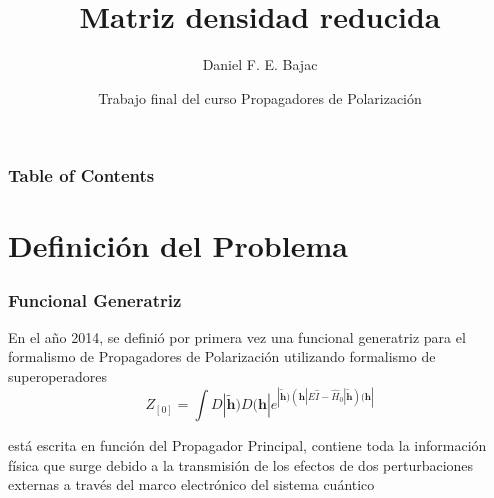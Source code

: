 \documentclass{beamer}
\title[Curso: Propagadoress de Polarización] %
{Matriz densidad reducida}
\author[Daniel F. E. Bajac] %
{Daniel F. E. Bajac}
\institute[] %
{
  Instituto de Modelado e Innovación Tecnológica, CONICET\\
  Departamento de Física, Facultad de Ciencias Exactas y Naturales, UNNE
}
\date[] %
{Trabajo final del curso Propagadores de Polarización}
\begin{document}
\frame{\titlepage}


\begin{frame}
\frametitle{Table of Contents}
\tableofcontents

\end{frame}


\section{Definición del Problema}

\begin{frame}
\frametitle{Funcional Generatriz}

En el año 2014, 
se definió por primera vez una funcional generatriz para el formalismo
de Propagadores de Polarización utilizando formalismo de superoperadores 
\pause
\begin{equation*}
	Z_{[0]} = \int D| \bm{\widetilde{h}} ) D (\bm{h}|  e^{| \bm{\widetilde{h}} ) (\bm{h}| E \hat{I} - \hat{H}_0 | \bm{\widetilde{h}} )   (\bm{h}|}
\end{equation*}

\vfill
está escrita en función del Propagador Principal, 
contiene toda la información física que surge debido a la transmisión
de los efectos de dos perturbaciones externas a través del marco electrónico 
del sistema cuántico



\end{frame}
\end{document}
